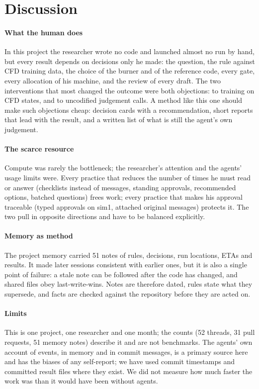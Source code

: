 \documentclass[preprint,review,12pt]{elsarticle}
\begin{document}
\section{Discussion}\label{sec:discussion}

\paragraph{What the human does} In this project the researcher wrote no code and launched almost no run by hand, but
every result depends on decisions only he made: the question, the rule against CFD training data, the choice of the
burner and of the reference code, every gate, every allocation of his machine, and the review of every draft. The two
interventions that most changed the outcome were both objections: to training on CFD states, and to uncodified
judgement calls. A method like this one should make such objections cheap: decision cards with a recommendation, short
reports that lead with the result, and a written list of what is still the agent's own judgement.

\paragraph{The scarce resource} Compute was rarely the bottleneck; the researcher's attention and the agents' usage
limits were. Every practice that reduces the number of times he must read or answer (checklists instead of messages,
standing approvals, recommended options, batched questions) frees work; every practice that makes his approval
traceable (typed approvals on sim1, attached original messages) protects it. The two pull in opposite directions and
have to be balanced explicitly.

\paragraph{Memory as method} The project memory carried 51 notes of rules, decisions, run locations, ETAs and results.
It made later sessions consistent with earlier ones, but it is also a single point of failure: a stale note can be
followed after the code has changed, and shared files obey last-write-wins. Notes are therefore dated, rules state what
they supersede, and facts are checked against the repository before they are acted on.

\paragraph{Limits} This is one project, one researcher and one month; the counts (52 threads, 31 pull requests, 51
memory notes) describe it and are not benchmarks. The agents' own account of events, in memory and in commit messages,
is a primary source here and has the biases of any self-report; we have used commit timestamps and committed result
files where they exist. We did not measure how much faster the work was than it would have been without agents.
\end{document}
